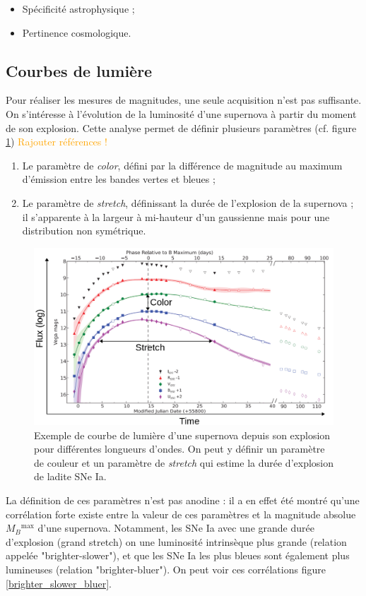 \documentclass[a4paper, 12pt, svgnames]{article}
\begin{document}
\begin{itemize}
    \item Spécificité astrophysique ;
    \item Pertinence cosmologique.
\end{itemize}

\subsection{Courbes de lumière}\label{ssec:lc}
Pour réaliser les mesures de magnitudes, une seule acquisition n'est pas
suffisante. On s'intéresse à l'évolution de la luminosité d'une supernova à
partir du moment de son explosion. Cette analyse permet de définir plusieurs
paramètres (cf. figure \ref{lightcurves}) \textcolor{orange}{Rajouter
références !}

\begin{enumerate}
    \item Le paramètre de \textit{color}, défini par la différence de magnitude
        au maximum d'émission entre les bandes vertes et bleues ;
    \item Le paramètre de \textit{stretch}, définissant la durée de l'explosion
        de la supernova ; il s'apparente à la largeur à mi-hauteur d'un
        gaussienne mais pour une distribution non symétrique.
\end{enumerate}

\begin{figure}[htbp!]
    \centering
    \includegraphics[width=.5\linewidth]{Rapport_figures/lightcurve.png}
    \captionsetup{justification=centering}
    \caption{Exemple de courbe de lumière d'une supernova depuis son explosion
    pour différentes longueurs d'ondes. On peut y définir un paramètre de
couleur et un paramètre de \textit{stretch} qui estime la durée d'explosion de
ladite SNe Ia.}
    \label{lightcurves}
\end{figure}

La définition de ces paramètres n'est pas anodine : il a en effet été montré
qu'une corrélation forte existe entre la valeur de ces paramètres et la
magnitude absolue $M_B{}^{\text{max}}$ d'une supernova. Notamment, les SNe Ia
avec une grande durée d'explosion (grand stretch) on une luminosité intrinsèque
plus grande (relation appelée "brighter-slower"), et que les SNe Ia les plus
bleues sont également plus lumineuses (relation "brighter-bluer"). On peut voir
ces corrélations figure \ref{brighter_slower_bluer}.
\end{document}
